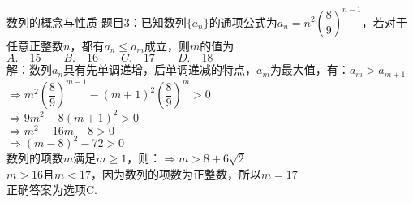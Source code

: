 \documentclass[aspectratio=169]{ctexbeamer} %
\date{\today}
\begin{document}
\begin{frame}[t]{数列的概念与性质}
题目3：已知数列$\{a_n\}$的通项公式为$a_n = n^2(\dfrac{8}{9})^{n-1}$，若对于任意正整数$n$，都有$a_n \le a_m$成立，则$m$的值为 \\
$A. \quad 15 \qquad B. \quad 16 \qquad C. \quad 17 \qquad D. \quad 18$ \\
\pause
解：数列${a_n}$具有先单调递增，后单调递减的特点，$a_m$为最大值，有：$a_{m} > a_{m+1}$ \\
\pause
$\Rightarrow m^2 \left(\dfrac{8}{9} \right)^{m-1} - (m+1)^2 \left(\dfrac{8}{9} \right)^{m} > 0$ \\
\pause
$\Rightarrow 9m^2 - 8(m+1)^2 > 0$ \\
\pause
$\Rightarrow m^2 - 16m - 8 > 0$ \\
\pause
$\Rightarrow (m - 8)^2 - 72 > 0$ \\
\pause
数列的项数$m$满足$m \ge 1$，则：$\Rightarrow m > 8 + 6\sqrt{2}$ \\
\pause
$m > 16$且$m<17$，因为数列的项数为正整数，所以$m = 17$ \\
正确答案为选项C.
\end{frame}
\end{document}
